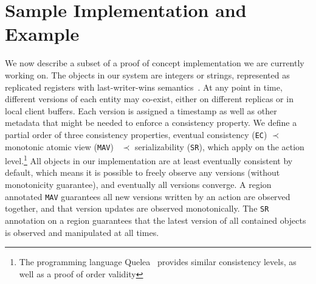 \documentclass[preprint,numbers]{sigplanconf}
\begin{document}
%


\section{Sample Implementation and Example}
\label{sec:example}
We now describe a subset of a proof of concept implementation we are currently working on.
The objects in our system are integers or strings,
represented as replicated registers with last-writer-wins
semantics~\cite{burckhardt2014replicated}. At any point in time, different
versions of each entity may
co-exist, either on different replicas or in local client buffers. Each version
is assigned a timestamp as well as other metadata that might be needed to
enforce a consistency property. We define a partial order of three consistency properties, eventual
consistency (\texttt{EC}) $\prec$ monotonic atomic view (\texttt{MAV})~\cite{bailis2013highly}  $\prec$
serializability (\texttt{SR}), which apply on the action level.\footnote{The programming language Quelea~\cite{sivaramakrishnan2015declarative} provides similar
consistency levels, as well as a proof of order validity} 
All objects in our implementation are at least eventually consistent by default, which means it
is possible to freely observe any versions (without monotonicity guarantee), and
eventually all versions converge. A region annotated \texttt{MAV} guarantees all new versions written by an
action are observed together, and that version updates are observed
monotonically. The \texttt{SR} annotation on a
region guarantees that the latest version of all
contained objects is observed and manipulated at all times. 
\end{document}
